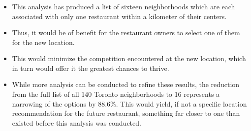 \documentclass[aspectratio=169]{beamer}
\begin{document}
\subsubsection{}
\begin{frame}
\begin{itemize}
 \item This analysis has produced a list of sixteen neighborhoods which are each associated with only one restaurant within a kilometer of their centers.
 \item Thus, it would be of benefit for the restaurant owners to select one of them for the new location.
 \item This would minimize the competition encountered at the new location, which in turn would offer it the greatest chances to thrive.
 \item While more analysis can be conducted to refine these results, the reduction from the full list of all 140 Toronto neighborhoods to 16 represents a narrowing of the options by 88.6\%. This would yield, if not a specific location recommendation for the future restaurant, something far closer to one than existed before this analysis was conducted.
\end{itemize}
\end{frame}

% 
% 

\end{document}
